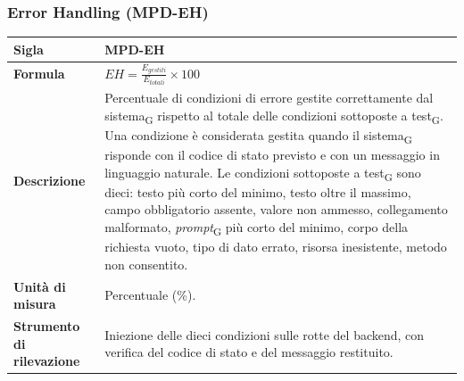 \documentclass[a4paper, 10pt]{article}
\begin{document}
\subsubsection{Error Handling (MPD-EH)}
\noindent
\begin{minipage}{\textwidth}
    \begin{tabularx}{\textwidth}{|>{\columncolor{bluBitless!10}\bfseries}p{3.5cm}|X|}
        \hline
        Sigla & MPD-EH \\ \hline
        Formula &
        \textit{$EH = \frac{E_{gestiti}}{E_{totali}} \times 100$} \\ \hline
        Descrizione & Percentuale di condizioni di errore gestite correttamente dal sistema\textsubscript{G} rispetto al totale delle condizioni sottoposte a test\textsubscript{G}. Una condizione è considerata gestita quando il sistema\textsubscript{G} risponde con il codice di stato previsto e con un messaggio in linguaggio naturale. Le condizioni sottoposte a test\textsubscript{G} sono dieci: testo più corto del minimo, testo oltre il massimo, campo obbligatorio assente, valore non ammesso, collegamento malformato, \textit{prompt}\textsubscript{G} più corto del minimo, corpo della richiesta vuoto, tipo di dato errato, risorsa inesistente, metodo non consentito. \\ \hline
        Unità di misura & Percentuale (\%). \\ \hline
        Strumento di rilevazione & Iniezione delle dieci condizioni sulle rotte del backend, con verifica del codice di stato e del messaggio restituito. \\ \hline
    \end{tabularx}
\end{minipage}

\vspace{0.8cm}
\end{document}
